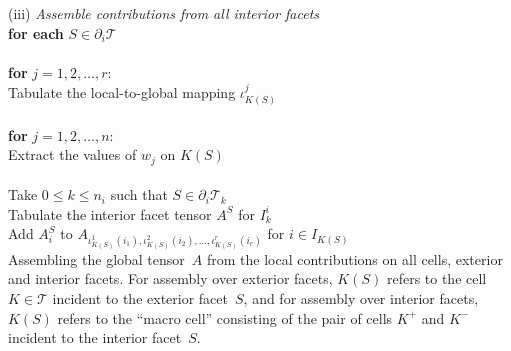 \begin{algorithm}
\\
\\
(iii) \emph{Assemble contributions from all interior facets} \\
\textbf{for each} $S \in \partial_i\mathcal{T}$ \\
\\
\tab \textbf{for} $j = 1,2,\ldots,r$: \\
\tab\tab Tabulate the local-to-global mapping $\iota_{K(S)}^j$ \\
\\
\tab \textbf{for} $j = 1,2,\ldots,n$: \\
\tab\tab Extract the values of $w_j$ on $K(S)$
\\
\\
\tab Take $0 \leq k \leq n_i$ such that $S \in \partial_i \mathcal{T}_k$ \\
\tab Tabulate the interior facet tensor $A^S$ for $I^i_k$ \\
\tab Add $A^S_i$ to $A_{\iota_{K(S)}^1(i_1), \iota_{K(S)}^2(i_2), \ldots, \iota_{K(S)}^r(i_r)}$ for $i\in I_{K(S)}$ \\
\caption{Assembling the global tensor~$A$ from the local contributions
  on all cells, exterior and interior facets. For assembly over
  exterior facets, $K(S)$ refers to the cell $K\in\mathcal{T}$ incident
  to the exterior facet~$S$, and for assembly over interior facets,
  $K(S)$ refers to the ``macro cell'' consisting of the pair of cells
  $K^+$ and $K^-$ incident to the interior facet~$S$.}
\label{alg:assembly}
\end{algorithm}
\normalsize
